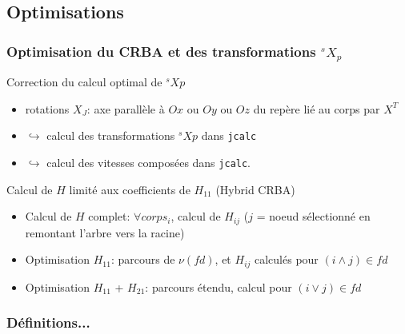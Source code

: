 \documentclass[10pt]{beamer}
\begin{document}


\subsection{Optimisations}

\begin{frame}
  \frametitle{Optimisation du CRBA et des transformations $^sX_p$}
  
  \begin{block}{Correction du calcul optimal de $^sXp$}
  \begin{itemize}
	  \item rotations $X_J$: axe parallèle à $Ox$ ou $Oy$ ou $Oz$ du repère lié au corps par $X^T$
	  \item $\hookrightarrow$ calcul des transformations $^sXp$ dans \verb;jcalc;
	  \item $\hookrightarrow$ calcul des vitesses composées dans \verb;jcalc;.
  \end{itemize}
  \end{block}
  
  \begin{block}{Calcul de $H$ limité aux coefficients de $H_{11}$ (Hybrid CRBA)}
  \begin{itemize}
    \item Calcul de $H$ complet: $\forall corps_i$, calcul de $H_{ij}$ ($j$ = noeud sélectionné en remontant l'arbre vers la racine)
	  \item Optimisation $H_{11}$: parcours de $\nu(fd)$, et $H_{ij}$ calculés pour $(i \wedge j) \in fd$
	  \item Optimisation $H_{11}$ + $H_{21}$: parcours étendu, calcul pour $(i \vee j) \in fd$
  \end{itemize}
	\end{block}    
  
\end{frame}


\begin{frame}
  \frametitle{Définitions...} \hypertarget{ch_optimisations}{}
  
  	\begin{columns}
	\begin{column}{.48\textwidth}
   \vfill
  \end{column}
  \begin{column}{.48\textwidth}
  \vfill {}
  \end{column}
  \end{columns}
  
  \hyperlink{app_algSpat2}{}
\end{frame}
\end{document}
